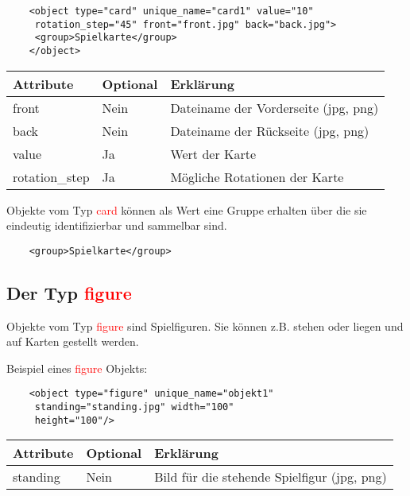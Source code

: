 \documentclass{scrbook}
\newcommand{\card}{\textcolor{red}{card}\xspace}
\newcommand{\gamefigure}{\textcolor{red}{figure}\xspace}
\begin{document}
	\lstset{language=XML}
	\begin{lstlisting}
	<object type="card" unique_name="card1" value="10"
	 rotation_step="45" front="front.jpg" back="back.jpg">
	 <group>Spielkarte</group>
	</object>
	\end{lstlisting}
	
	\begin{table}[!h]
		\renewcommand{\arraystretch}{1.5}		\begin{tabularx}{\textwidth}{XXX}
			Attribute & Optional & Erklärung\\\hline
			front & Nein & Dateiname der Vorderseite (jpg, png)\\
			back & Nein & Dateiname der Rückseite (jpg, png)\\
			value & Ja & Wert der Karte\\
			rotation\_step & Ja & Mögliche Rotationen der Karte\\
		\end{tabularx}
	\end{table}

	Objekte vom Typ \card können als Wert eine Gruppe erhalten über die sie eindeutig identifizierbar und sammelbar sind.

	\lstset{language=XML}
	\begin{lstlisting}	
	<group>Spielkarte</group>
	\end{lstlisting}

	\subsection{Der Typ \gamefigure}
	Objekte vom Typ \gamefigure sind Spielfiguren. Sie können z.B. stehen oder liegen und auf Karten gestellt werden.

	Beispiel eines \gamefigure Objekts:
	
	\lstset{language=XML}
	\begin{lstlisting}	
	<object type="figure" unique_name="objekt1"
	 standing="standing.jpg" width="100" 
	 height="100"/>
	\end{lstlisting}
	

	\begin{table}[!h]
		\renewcommand{\arraystretch}{1.5}
		\begin{tabularx}{\textwidth}{XXX}
			Attribute & Optional & Erklärung\\\hline
			standing & Nein & Bild für die stehende Spielfigur (jpg, png)
		\end{tabularx}
	\end{table}
\end{document}
